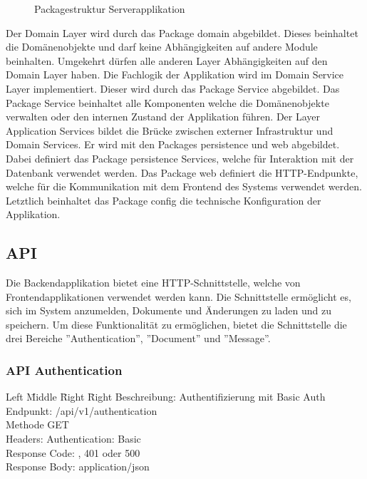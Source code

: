 \begin{figure}[h]
    \centering
    \begin{minipage}[b]{0.9\textwidth}
        \caption{Packagestruktur Serverapplikation}\label{fig:packagesserver}
    \end{minipage}
\end{figure}

Der Domain Layer wird durch das Package domain abgebildet.
Dieses beinhaltet die Domänenobjekte und darf keine Abhängigkeiten auf andere Module beinhalten.
Umgekehrt dürfen alle anderen Layer Abhängigkeiten auf den Domain Layer haben.
Die Fachlogik der Applikation wird im Domain Service Layer implementiert.
Dieser wird durch das Package Service abgebildet.
Das Package Service beinhaltet alle Komponenten welche die Domänenobjekte verwalten oder den internen Zustand der Applikation führen.
Der Layer Application Services bildet die Brücke zwischen externer Infrastruktur und Domain Services.
Er wird mit den Packages persistence und web abgebildet.
Dabei definiert das Package persistence Services, welche für Interaktion mit der Datenbank verwendet werden.
Das Package web definiert die HTTP-Endpunkte, welche für die Kommunikation mit dem Frontend des Systems verwendet werden.
Letztlich beinhaltet das Package config die technische Konfiguration der Applikation.

\clearpage

\subsection{API}\label{subsec:api}

Die Backendapplikation bietet eine HTTP-Schnittstelle, welche von Frontendapplikationen verwendet werden kann.
Die Schnittstelle ermöglicht es, sich im System anzumelden, Dokumente und Änderungen zu laden und zu speichern.
Um diese Funktionalität zu ermöglichen, bietet die Schnittstelle die drei Bereiche ''Authentication'', ''Document'' und ''Message''.

\subsubsection{API Authentication}

\begin{tabbing}
Left \= Middle \= Right \= Right \kill
Beschreibung:  \> \> \> Authentifizierung mit Basic Auth\\
Endpunkt:  \> \> \> /api/v1/authentication\\
Methode \>  \> \> GET\\
Headers:  \> \>   \> Authentication: Basic \\
Response Code:  \> \>  , 401 oder 500 \\
Response Body:  \> \>  \> application/json \\
\end{tabbing}

